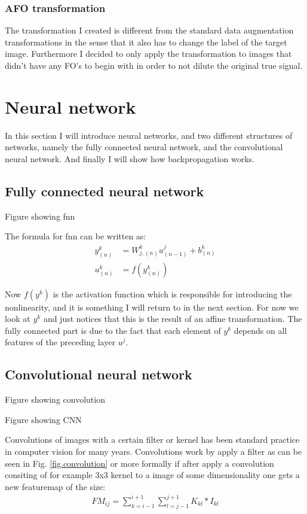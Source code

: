 \subsubsection{AFO transformation}
The transformation I created is different from the standard data augmentation transformations in the sense that it also has to change the label of the target image. Furthermore I decided to only apply the transformation to images that didn't have any FO's to begin with in order to not dilute the original true signal.

\newpage
\section{Neural network}
In this section I will introduce neural networks, and two different structures of networks, namely the fully connected neural network, and the convolutional neural network. And finally I will show how backpropagation works.

\subsection{Fully connected neural network}
\begin{marginfigure}
  \missingfigure{}%
\caption{Figure showing fnn}
\end{marginfigure} 
The formula for fnn can be written as:
\begin{align}
	y_{(n)}^{k} &= W_{j,(n)}^k u_{(n-1)}^j + b_{(n)}^k \\
	u_{(n)}^k &= f(y_{(n)}^k)
\end{align}

Now $f(y^k)$ is the activation function which is responsible for introducing the nonlinearity, and it is something I will return to in the next section. For now we look at $y^k$ and just notices that this is the result of an affine transformation. The fully connected part is due to the fact that each element of $y^k$ depends on all features of the preceding layer $u^j$. 


\subsection{Convolutional neural network}
\begin{marginfigure}
  \missingfigure{}%
\caption{Figure showing convolution}
\label{fig.convolution}
\end{marginfigure}
\begin{marginfigure}
  \missingfigure{}%
\caption{Figure showing CNN}
\end{marginfigure} 
Convolutions of images with a certain filter or kernel has been standard practice in computer vision for many years. Convolutions work by apply a filter as can be seen in Fig. \ref{fig.convolution} or more formally if after apply a convolution consiting of for example 3x3 kernel to a image of some dimensionality one gets a new featuremap of the size:
\begin{align}
	FM_{ij} = \sum_{k=i-1}^{i+1} \sum_{l=j-1}^{j+1} K_{kl} * I_{kl}
\end{align}

